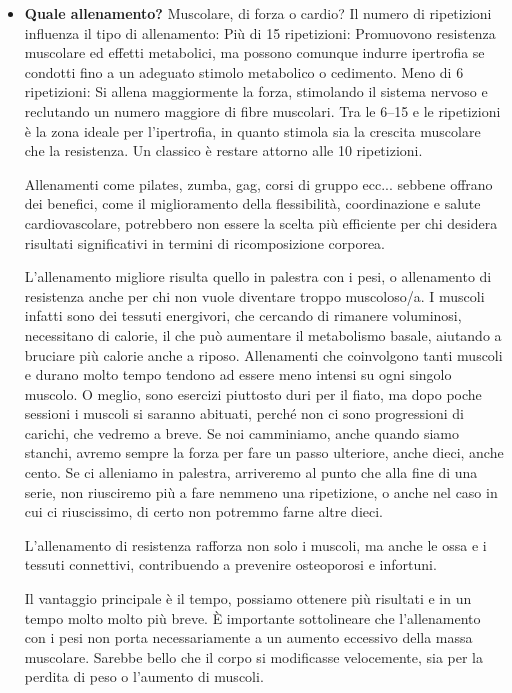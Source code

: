 \documentclass[12pt]{book} %
\begin{document}
\begin{itemize}
\item \textbf{Quale allenamento?}
Muscolare, di forza o cardio?
Il numero di ripetizioni influenza il tipo di allenamento:
Più di 15 ripetizioni: Promuovono resistenza muscolare ed effetti metabolici, ma possono comunque indurre ipertrofia se condotti fino a un adeguato stimolo metabolico o cedimento.
Meno di 6 ripetizioni: Si allena maggiormente la forza, stimolando il sistema nervoso e reclutando un numero maggiore di fibre muscolari.
Tra le 6–15 e le ripetizioni è la zona ideale per l'ipertrofia, in quanto stimola sia la crescita muscolare che la resistenza. Un classico è restare attorno alle 10 ripetizioni.

Allenamenti come pilates, zumba, gag,  corsi di gruppo ecc... sebbene offrano dei benefici, come il miglioramento della flessibilità, coordinazione e salute cardiovascolare, potrebbero non essere la scelta più efficiente per chi desidera risultati significativi in termini di ricomposizione corporea.

L'allenamento migliore risulta quello in palestra con i pesi, o allenamento di resistenza anche per chi non vuole diventare troppo muscoloso/a.
I muscoli infatti sono dei tessuti energivori, che cercando di rimanere voluminosi, necessitano di calorie, il che può aumentare il metabolismo basale, aiutando a bruciare più calorie anche a riposo.
Allenamenti che coinvolgono tanti muscoli e durano molto tempo tendono ad essere meno intensi su ogni singolo muscolo. O meglio, sono esercizi piuttosto duri per il fiato, ma dopo poche sessioni i muscoli si saranno abituati, perché non ci sono progressioni di carichi, che vedremo a breve. Se noi camminiamo, anche quando siamo stanchi, avremo sempre la forza per fare un passo ulteriore, anche dieci, anche cento. Se ci alleniamo in palestra, arriveremo al punto che alla fine di una serie, non riusciremo più a fare nemmeno una ripetizione, o anche nel caso in cui ci riuscissimo, di certo non potremmo farne altre dieci.

L'allenamento di resistenza rafforza non solo i muscoli, ma anche le ossa e i tessuti connettivi, contribuendo a prevenire osteoporosi e infortuni. 

Il vantaggio principale è il tempo, possiamo ottenere più risultati e in un tempo molto molto più breve. È importante sottolineare che l'allenamento con i pesi non porta necessariamente a un aumento eccessivo della massa muscolare. Sarebbe bello che il corpo si modificasse velocemente, sia per la perdita di peso o l'aumento di muscoli.


\end{itemize}
\end{document}
